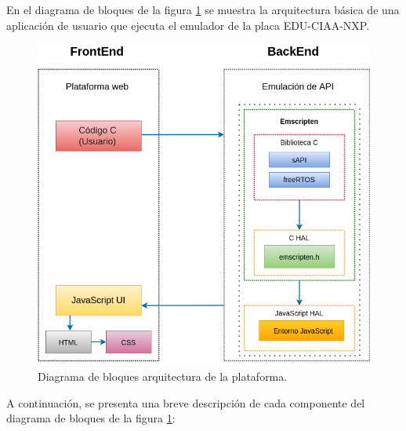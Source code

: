 En el diagrama de bloques de la figura \ref{fig:Arquitectura} se muestra la arquitectura básica de una aplicación de usuario que ejecuta el emulador de la placa EDU-CIAA-NXP.


\begin{figure}[ht]
	\centering
	\includegraphics[scale=.55]{./Figures/Arquitectura.png}
	\caption{Diagrama de bloques arquitectura de la plataforma.}
	\label{fig:Arquitectura}
\end{figure}

A continuación, se presenta una breve descripción de cada componente del diagrama de bloques de la figura \ref{fig:Arquitectura}:

